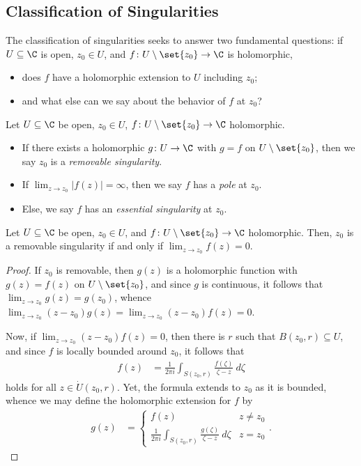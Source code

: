 \documentclass[10pt]{mypackage}
\begin{document}
\subsection{Classification of Singularities}%
The classification of singularities seeks to answer two fundamental questions: if $U\subseteq \C$ is open, $z_0\in U$, and $f\colon U\setminus \set{z_0}\rightarrow \C$ is holomorphic, 
\begin{itemize}
  \item does $f$ have a holomorphic extension to $U$ including $z_0$;
  \item and what else can we say about the behavior of $f$ at $z_0$?
\end{itemize}
\begin{definition}
  Let $U\subseteq \C$ be open, $z_0\in U$, $f\colon U\setminus \set{z_0}\rightarrow \C$ holomorphic.
  \begin{itemize}
    \item If there exists a holomorphic $g\colon U\rightarrow \C$ with $g = f$ on $U\setminus \set{z_0}$, then we say $z_0$ is a \textit{removable singularity}.
    \item If $\lim_{z\rightarrow z_0} \left\vert f(z) \right\vert = \infty$, then we say $f$ has a \textit{pole} at $z_0$.
    \item Else, we say $f$ has an \textit{essential singularity} at $z_0$.
  \end{itemize}
\end{definition}
\begin{theorem}
  Let $U\subseteq \C$ be open, $z_0\in U$, and $f\colon U\setminus \set{z_0}\rightarrow \C$ holomorphic. Then, $z_0$ is a removable singularity if and only if $\lim_{z\rightarrow z_0}f(z) = 0$.
\end{theorem}
\begin{proof}
  If $z_0$ is removable, then $g(z)$ is a holomorphic function with $g(z) = f(z)$ on $U\setminus \set{z_0}$, and since $g$ is continuous, it follows that $\lim_{z\rightarrow z_0}g(z) = g\left(z_0\right)$, whence $\lim_{z\rightarrow z_0}\left( z-z_0 \right)g(z) = \lim_{z\rightarrow z_0}\left( z-z_0 \right)f(z) = 0$.\newline

  Now, if $\lim_{z\rightarrow z_0}\left( z-z_0 \right)f(z) = 0$, then there is $r$ such that $B\left( z_0,r \right)\subseteq U$, and since $f$ is locally bounded around $z_0$, it follows that
  \begin{align*}
    f(z) &= \frac{1}{2\pi i} \int_{S\left( z_0,r \right)}^{} \frac{f\left( \zeta \right)}{\zeta - z}\:d\zeta
  \end{align*}
  holds for all $z\in \dot{U}\left( z_0,r \right)$. Yet, the formula extends to $z_0$ as it is bounded, whence we may define the holomorphic extension for $f$ by
  \begin{align*}
    g\left( z \right) &= \begin{cases}
      f(z) & z\neq z_0\\
      \frac{1}{2\pi i} \int_{S\left( z_0,r \right)}^{} \frac{g\left( \zeta \right)}{\zeta - z}\:d\zeta & z= z_0
    \end{cases}.
  \end{align*}
\end{proof}
\end{document}
